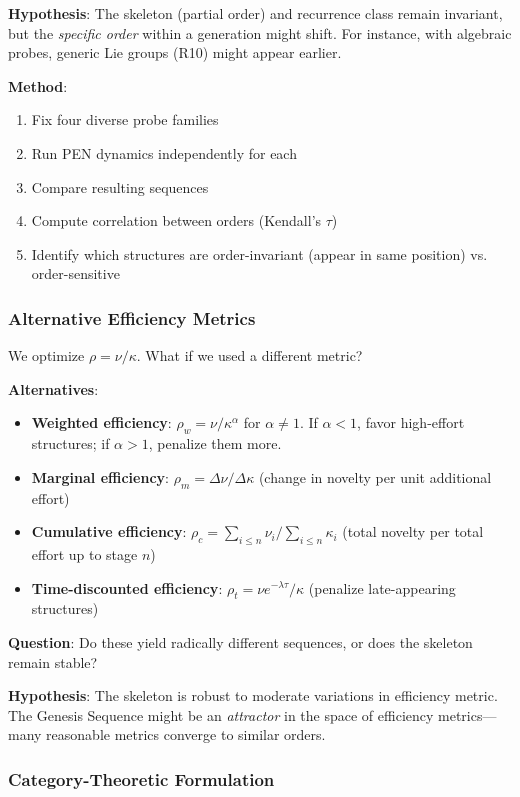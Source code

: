 \documentclass[11pt]{article}
\theoremstyle{definition}
\begin{document}
\textbf{Hypothesis}: The skeleton (partial order) and recurrence class remain invariant, but the \emph{specific order} within a generation might shift. For instance, with algebraic probes, generic Lie groups (R10) might appear earlier.

\textbf{Method}: 
\begin{enumerate}
\item Fix four diverse probe families
\item Run PEN dynamics independently for each
\item Compare resulting sequences
\item Compute correlation between orders (Kendall's $\tau$)
\item Identify which structures are order-invariant (appear in same position) vs. order-sensitive
\end{enumerate}

\subsubsection{Alternative Efficiency Metrics}

We optimize $\rho = \nu/\kappa$. What if we used a different metric?

\textbf{Alternatives}:
\begin{itemize}
\item \textbf{Weighted efficiency}: $\rho_w = \nu/\kappa^\alpha$ for $\alpha \neq 1$. If $\alpha < 1$, favor high-effort structures; if $\alpha > 1$, penalize them more.
\item \textbf{Marginal efficiency}: $\rho_m = \Delta\nu/\Delta\kappa$ (change in novelty per unit additional effort)
\item \textbf{Cumulative efficiency}: $\rho_c = \sum_{i \leq n} \nu_i / \sum_{i \leq n} \kappa_i$ (total novelty per total effort up to stage $n$)
\item \textbf{Time-discounted efficiency}: $\rho_t = \nu e^{-\lambda \tau} / \kappa$ (penalize late-appearing structures)
\end{itemize}

\textbf{Question}: Do these yield radically different sequences, or does the skeleton remain stable?

\textbf{Hypothesis}: The skeleton is robust to moderate variations in efficiency metric. The Genesis Sequence might be an \emph{attractor} in the space of efficiency metrics—many reasonable metrics converge to similar orders.

\subsubsection{Category-Theoretic Formulation}
\end{document}
